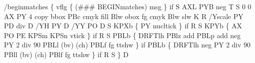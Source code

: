 \documentclass[11pt]{article}
\begin{document}
\nwenddocs{}\endmoddef
/beginmatches \{   %
  vflg \{ (### BEGINmatches) msg \} if  %
  S               %
    AXL           %
    PYB neg       %
    T             %
    S             %
      0 0         %
      AX PY       %
      4 copy      %
      bbox        %
      PBc cmyk    %
      fill        %
      Blw obox  %
      fg cmyk   %
      Blw slw   %
      K         %
    R             %
    /Yscale       %
      PY PD div   %
    D             %
    /YH           %
      PY          %
    D             %
    /YY           %
      PO          %
    D             %
    S             %
      KPXb \{      %
        PY nucltick  %
      \} if        %
    R             %
    S             %
      KPYb \{      %
        AX        %
        PO PE     %
        KPSm KPSn %
          vtick   %
      \} if        %
    R             %
    S             %
      PBLb \{      %
        DRFTlh    %
        PBlz add  %
        PBLp add  %
        neg       %
        PY 2 div  %
        90        %
        PBLl      %
        (bv) (ch) %
        PBLf      %
        fg        %
        ttshw     %
      \} if        %
      PBLb \{      %
        DRFTlh    %
        neg       %
        PY 2 div  %
        90        %
        PBll      %
        (bv) (ch) %
        PBlf      %
        fg        %
        ttshw     %
      \} if        %
    R             %
    S   %
\} D               %
\eatline
\end{document}
